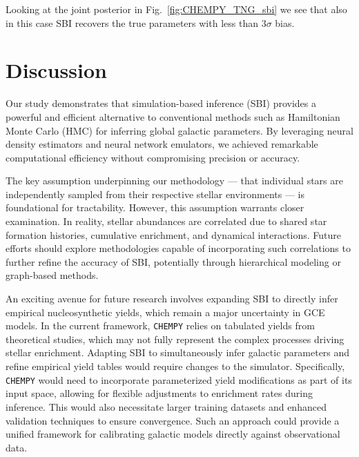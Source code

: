 \documentclass{aa}
\begin{document}
Looking at the joint posterior in Fig.~\ref{fig:CHEMPY_TNG_sbi} we see that also in this case SBI recovers the true parameters with less than $3\sigma$ bias.



\section{Discussion}
\label{sec: discussion}


Our study demonstrates that simulation-based inference (SBI) provides a powerful and efficient alternative to conventional methods such as Hamiltonian Monte Carlo (HMC) for inferring global galactic parameters. By leveraging neural density estimators and neural network emulators, we achieved remarkable computational efficiency without compromising precision or accuracy.

The key assumption underpinning our methodology — that individual stars are independently sampled from their respective stellar environments — is foundational for tractability. However, this assumption warrants closer examination. In reality, stellar abundances are correlated due to shared star formation histories, cumulative enrichment, and dynamical interactions. Future efforts should explore methodologies capable of incorporating such correlations to further refine the accuracy of SBI, potentially through hierarchical modeling or graph-based methods.

An exciting avenue for future research involves expanding SBI to directly infer empirical nucleosynthetic yields, which remain a major uncertainty in GCE models. In the current framework, \texttt{CHEMPY} relies on tabulated yields from theoretical studies, which may not fully represent the complex processes driving stellar enrichment. Adapting SBI to simultaneously infer galactic parameters and refine empirical yield tables would require changes to the simulator. Specifically, \texttt{CHEMPY} would need to incorporate parameterized yield modifications as part of its input space, allowing for flexible adjustments to enrichment rates during inference. This would also necessitate larger training datasets and enhanced validation techniques to ensure convergence. Such an approach could provide a unified framework for calibrating galactic models directly against observational data.
\end{document}
